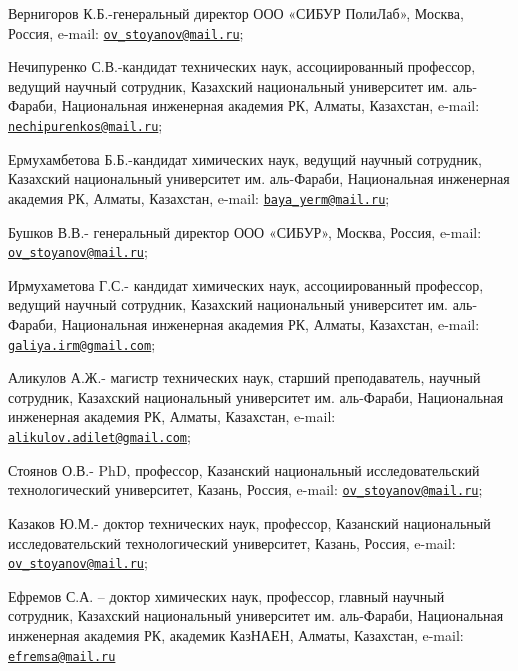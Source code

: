 \begin{authorinfo}
Вернигоров К.Б.-генеральный директор ООО «СИБУР ПолиЛаб», Москва,
Россия, e-mail:
\href{mailto:ov_stoyanov@mail.ru}{\nolinkurl{ov\_stoyanov@mail.ru}};

Нечипуренко С.В.-кандидат технических наук, ассоциированный профессор,
ведущий научный сотрудник, Казахский национальный университет им.
аль-Фараби, Национальная инженерная академия РК, Алматы, Казахстан,
e-mail:
\\\href{mailto:nechipurenkos@mail.ru}{\nolinkurl{nechipurenkos@mail.ru}};

Ермухамбетова Б.Б.-кандидат химических наук, ведущий научный сотрудник,
Казахский национальный университет им. аль-Фараби, Национальная
инженерная академия РК, Алматы, Казахстан, e-mail:
\href{mailto:baya_yerm@mail.ru}{\nolinkurl{baya\_yerm@mail.ru}};

Бушков В.В.- генеральный директор ООО «СИБУР», Москва, Россия, e-mail:
\href{mailto:ov_stoyanov@mail.ru}{\nolinkurl{ov\_stoyanov@mail.ru}};

Ирмухаметова Г.С.- кандидат химических наук, ассоциированный профессор,
ведущий научный сотрудник, Казахский национальный университет им.
аль-Фараби, Национальная инженерная академия РК, Алматы, Казахстан,
e-mail:
\\\href{mailto:galiya.irm@gmail.com}{\nolinkurl{galiya.irm@gmail.com}};

Аликулов А.Ж.- магистр технических наук, старший преподаватель, научный
сотрудник, Казахский национальный университет им. аль-Фараби,
Национальная инженерная академия РК, Алматы, Казахстан, e-mail:
\href{mailto:alikulov.adilet@gmail.com}{\nolinkurl{alikulov.adilet@gmail.com}};

Стоянов О.В.- PhD, профессор, Казанский национальный исследовательский
технологический университет, Казань, Россия, e-mail:
\href{mailto:ov_stoyanov@mail.ru}{\nolinkurl{ov\_stoyanov@mail.ru}};

Казаков Ю.М.- доктор технических наук, профессор, Казанский национальный
исследовательский технологический университет, Казань, Россия, e-mail:
\href{mailto:ov_stoyanov@mail.ru}{\nolinkurl{ov\_stoyanov@mail.ru}};

Ефремов С.А. -- доктор химических наук, профессор, главный научный
сотрудник, Казахский национальный университет им. аль-Фараби,
Национальная инженерная академия РК, академик КазНАЕН, Алматы,
Казахстан, e-mail:
\\\href{mailto:efremsa@mail.ru}{\nolinkurl{efremsa@mail.ru}}
\end{authorinfo}
